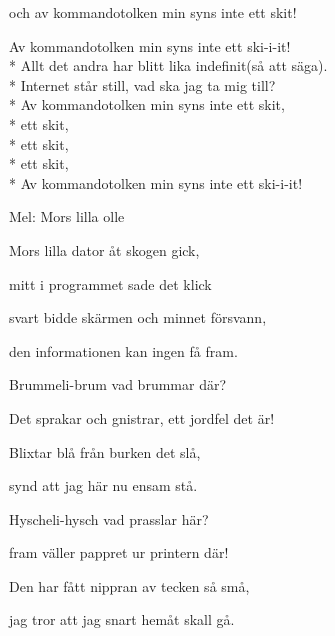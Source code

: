 \begin{SongText}[Kommandotolken]
\begin{Verse}
        och av kommandotolken min syns inte ett skit!
    \end{Verse}
    \begin{Verse}
        Av kommandotolken min syns inte ett ski-i-it!\\*%
        Allt det andra har blitt lika indefinit(så att säga).\\*%
        Internet står still, vad ska jag ta mig till?\\*%
        Av kommandotolken min syns inte ett skit,\\*%
        ett skit,\\*%
        ett skit,\\*%
        ett skit,\\*%
        Av kommandotolken min syns inte ett ski-i-it!
    \end{Verse}
\end{SongText}

\begin{SongText}
    \begin{SongInfo}
        Mel: Mors lilla olle
    \end{SongInfo}
    \begin{Verse}
        Mors lilla dator åt skogen gick,

        mitt i programmet sade det klick

        svart bidde skärmen och minnet försvann,

        den informationen kan ingen få fram.
    \end{Verse}
    \begin{Verse}
        Brummeli-brum vad brummar där?

        Det sprakar och gnistrar, ett jordfel det är!

        Blixtar blå från burken det slå,

        synd att jag här nu ensam stå.
    \end{Verse}
    \begin{Verse}
        Hyscheli-hysch vad prasslar här?

        fram väller pappret ur printern där!

        Den har fått nippran av tecken så små,

        jag tror att jag snart hemåt skall gå.
    \end{Verse}
\end{SongText}